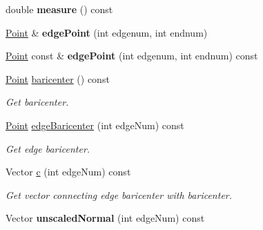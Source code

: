 \begin{DoxyCompactItemize}
\item 
\hypertarget{classGeometry_1_1Triangle_addc9390cffc7324c665c9400308b4111}{double {\bfseries measure} () const }\label{classGeometry_1_1Triangle_addc9390cffc7324c665c9400308b4111}

\item 
\hypertarget{classGeometry_1_1Triangle_a71bc76770270afe48db62d3775745d4d}{\hyperlink{classGeometry_1_1Point}{Point} \& {\bfseries edge\-Point} (int edgenum, int endnum)}\label{classGeometry_1_1Triangle_a71bc76770270afe48db62d3775745d4d}

\item 
\hypertarget{classGeometry_1_1Triangle_a2a06e3dc4d744016849686192e9089e7}{\hyperlink{classGeometry_1_1Point}{Point} const \& {\bfseries edge\-Point} (int edgenum, int endnum) const }\label{classGeometry_1_1Triangle_a2a06e3dc4d744016849686192e9089e7}

\item 
\hypertarget{classGeometry_1_1Triangle_ad592c6864a2beb58100f1034302141ed}{\hyperlink{classGeometry_1_1Point}{Point} \hyperlink{classGeometry_1_1Triangle_ad592c6864a2beb58100f1034302141ed}{baricenter} () const }\label{classGeometry_1_1Triangle_ad592c6864a2beb58100f1034302141ed}

\begin{DoxyCompactList}\small\item\em Get baricenter. \end{DoxyCompactList}\item 
\hypertarget{classGeometry_1_1Triangle_ae0fdef1792dae3656e28244e813b72ce}{\hyperlink{classGeometry_1_1Point}{Point} \hyperlink{classGeometry_1_1Triangle_ae0fdef1792dae3656e28244e813b72ce}{edge\-Baricenter} (int edge\-Num) const }\label{classGeometry_1_1Triangle_ae0fdef1792dae3656e28244e813b72ce}

\begin{DoxyCompactList}\small\item\em Get edge baricenter. \end{DoxyCompactList}\item 
\hypertarget{classGeometry_1_1Triangle_a3871968b3b73e4d01c86982e4a9fb1d2}{Vector \hyperlink{classGeometry_1_1Triangle_a3871968b3b73e4d01c86982e4a9fb1d2}{c} (int edge\-Num) const }\label{classGeometry_1_1Triangle_a3871968b3b73e4d01c86982e4a9fb1d2}

\begin{DoxyCompactList}\small\item\em Get vector connecting edge baricenter with baricenter. \end{DoxyCompactList}\item 
\hypertarget{classGeometry_1_1Triangle_a29b7778db243dc2adb597d3128b8aa36}{Vector {\bfseries unscaled\-Normal} (int edge\-Num) const }\label{classGeometry_1_1Triangle_a29b7778db243dc2adb597d3128b8aa36}

\end{DoxyCompactItemize}
